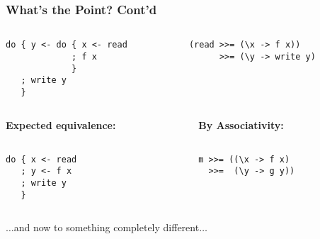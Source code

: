 \documentclass{beamer}
\begin{document}
\begin{frame}[fragile]
\frametitle{What's the Point? Cont'd}
\begin{columns}[t]
{
  \begin{column}{5cm}
\begin{lstlisting}
do { y <- do { x <- read
             ; f x
             }
   ; write y    
   }   
\end{lstlisting}
  \end{column}
  }
  {
  \begin{column}{5cm}
\begin{lstlisting}
(read >>= (\x -> f x)) 
      >>= (\y -> write y)
      
\end{lstlisting}
  \end{column}
  }
\end{columns}
\begin{columns}[t]
  \begin{column}{5cm}
{
  \textbf{Expected equivalence:}
\begin{lstlisting}

do { x <- read
   ; y <- f x
   ; write y 
   }
\end{lstlisting}
}
  \end{column}
  \begin{column}{5cm}
{
\textbf{By Associativity:}
\begin{lstlisting}

m >>= ((\x -> f x) 
  >>=  (\y -> g y))
\end{lstlisting}
}
  \end{column}
\end{columns}
\end{frame}


\begin{frame}
\large{$\dots$and now to something completely different$\dots$}
\end{frame}



\end{document}
